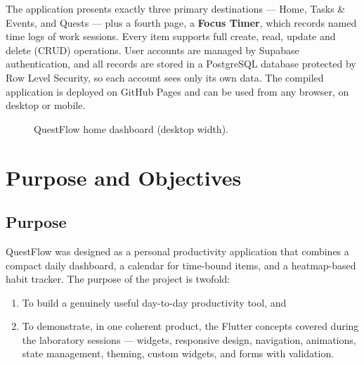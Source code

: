 \documentclass[12pt,a4paper]{article}
\begin{document}
The application presents exactly three primary destinations --- Home,
Tasks \& Events, and Quests --- plus a fourth page, a \textbf{Focus Timer},
which records named time logs of work sessions. Every item supports full
create, read, update and delete (CRUD) operations. User accounts are managed
by Supabase authentication, and all records are stored in a PostgreSQL
database protected by Row Level Security, so each account sees only its own
data. The compiled application is deployed on GitHub Pages and can be used
from any browser, on desktop or mobile.

\begin{figure}[H]
  \centering
  \caption{QuestFlow home dashboard (desktop width).}
  \label{fig:home}
\end{figure}

\section{Purpose and Objectives}

\subsection{Purpose}
QuestFlow was designed as a personal productivity application that combines
a compact daily dashboard, a calendar for time-bound items, and a
heatmap-based habit tracker. The purpose of the project is twofold:

\begin{enumerate}
  \item To build a genuinely useful day-to-day productivity tool, and
  \item To demonstrate, in one coherent product, the Flutter concepts
        covered during the laboratory sessions --- widgets, responsive
        design, navigation, animations, state management, theming, custom
        widgets, and forms with validation.
\end{enumerate}
\end{document}
